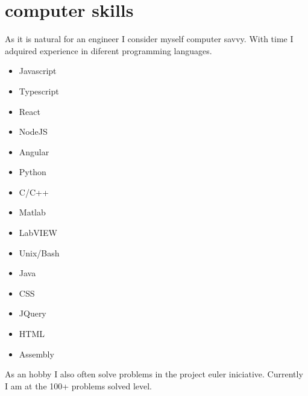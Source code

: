 \documentclass[]{friggeri-cv}
\begin{document}


\section{computer skills}
As it is natural for an engineer I consider myself computer savvy. With time I adquired experience in diferent programming languages.


\setlength{\columnsep}{0cm}
\begin{multicols}{2}
	\begin{itemize} \itemsep0.5pt \parskip-1pt 
		\item Javascript
		\item Typescript
		\item React
		\item NodeJS
		\item Angular
		\item Python
		\item C/C++
		\item Matlab
		\item LabVIEW
		\item Unix/Bash
		\item Java
		\item CSS
		\item JQuery
		\item HTML
		\item Assembly
	\end{itemize}
\end{multicols}



As an hobby I also often solve problems in the project euler iniciative. Currently I am at the 100+ problems solved level.
\end{document}
